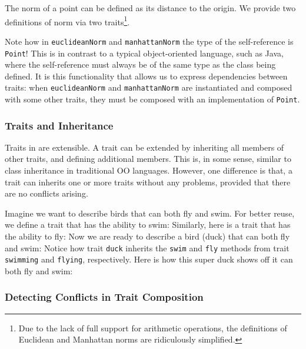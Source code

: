 The norm of a point can be defined as its distance to the origin. We provide two
definitions of norm via two traits\footnote{Due to the lack of full support for
  arithmetic operations, the definitions of Euclidean and Manhattan norms are
  ridiculously simplified. }.


Note how in \lstinline$euclideanNorm$ and \lstinline$manhattanNorm$ the type of
the self-reference is \lstinline$Point$! This is in contrast to a typical
object-oriented language, such as Java, where the self-reference must always be
of the same type as the class being defined. It is this functionality that
allows us to express dependencies between traits: when \lstinline$euclideanNorm$
and \lstinline$manhattanNorm$ are instantiated and composed with some other
traits, they must be composed with an implementation of \lstinline$Point$.

\subsubsection{Traits and Inheritance}

Traits in \name are extensible. A trait can be extended by inheriting all
members of other traits, and defining additional members. This is, in some
sense, similar to class inheritance in traditional OO languages. However, one
difference is that, a trait can inherits one or more traits without any
problems, provided that there are no conflicts arising.

Imagine we want to describe birds that can both fly and swim. For better reuse,
we define a trait that has the ability to swim:
Similarly, here is a trait that has the ability to fly:
Now we are ready to describe a bird (duck) that can both fly and swim:
Notice how trait \lstinline{duck} inherits the \lstinline{swim} and
\lstinline{fly} methods from trait \lstinline{swimming} and \lstinline{flying},
respectively. Here is how this super duck shows off it can both fly and swim:


\subsubsection{Detecting Conflicts in Trait Composition}

